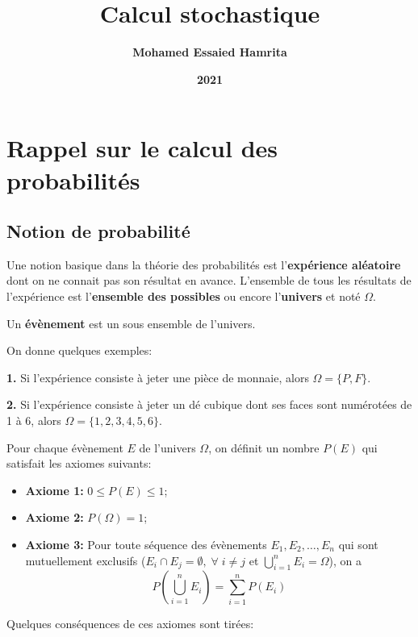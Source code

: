 \documentclass[
]{book}
\title{Calcul stochastique}
\author{\textbf{Mohamed Essaied Hamrita}}
\date{\textbf{2021}}
\providecommand{\tightlist}{%
  \setlength{\itemsep}{0pt}\setlength{\parskip}{0pt}}
\theoremstyle{definition}
\theoremstyle{definition}
\theoremstyle{definition}
\theoremstyle{remark}
\begin{document}
\maketitle

{
\setcounter{tocdepth}{1}
\tableofcontents
}
\hypertarget{rappel-sur-le-calcul-des-probabilituxe9s}{%
\chapter{Rappel sur le calcul des probabilités}\label{rappel-sur-le-calcul-des-probabilituxe9s}}

\hypertarget{notion-de-probabilituxe9}{%
\section{Notion de probabilité}\label{notion-de-probabilituxe9}}

Une notion basique dans la théorie des probabilités est l'\textbf{expérience aléatoire} dont on ne connait pas son résultat en avance. L'ensemble de tous les résultats de l'expérience est l'\textbf{ensemble des possibles} ou encore l'\textbf{univers} et noté \(\Omega\).

Un \textbf{évènement} est un sous ensemble de l'univers.

On donne quelques exemples:

\textbf{1.} Si l'expérience consiste à jeter une pièce de monnaie, alors \(\Omega=\{P,F\}\).

\textbf{2.} Si l'expérience consiste à jeter un dé cubique dont ses faces sont numérotées de 1 à 6, alors \(\Omega=\{1,2,3,4,5,6 \}\).

Pour chaque évènement \(E\) de l'univers \(\Omega\), on définit un nombre \(P(E)\) qui satisfait les axiomes suivants:

\begin{itemize}
\tightlist
\item
  \textbf{Axiome 1:} \(0 \leq P(E) \leq 1\);
\item
  \textbf{Axiome 2:} \(P(\Omega)=1\);
\item
  \textbf{Axiome 3:} Pour toute séquence des évènements \(E_1 , E_2, \ldots , E_n\) qui sont mutuellement exclusifs (\(E_i \cap E_j=\emptyset , \; \forall \; i \neq j\) et \(\displaystyle{\bigcup\limits_{i=1}^nE_i=\Omega}\)), on a
  \[
  P \left(\bigcup\limits_{i=1}^nE_i \right)=\sum_{i=1}^n P(E_i)
  \]
\end{itemize}

Quelques conséquences de ces axiomes sont tirées:
\end{document}
